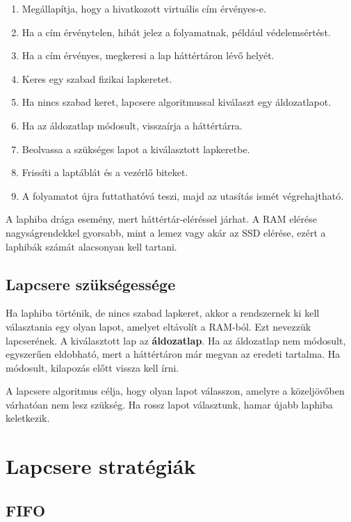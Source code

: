 \begin{enumerate}
  \item Megállapítja, hogy a hivatkozott virtuális cím érvényes-e.
  \item Ha a cím érvénytelen, hibát jelez a folyamatnak, például védelemsértést.
  \item Ha a cím érvényes, megkeresi a lap háttértáron lévő helyét.
  \item Keres egy szabad fizikai lapkeretet.
  \item Ha nincs szabad keret, lapcsere algoritmussal kiválaszt egy áldozatlapot.
  \item Ha az áldozatlap módosult, visszaírja a háttértárra.
  \item Beolvassa a szükséges lapot a kiválasztott lapkeretbe.
  \item Frissíti a laptáblát és a vezérlő biteket.
  \item A folyamatot újra futtathatóvá teszi, majd az utasítás ismét végrehajtható.
\end{enumerate}

A laphiba drága esemény, mert háttértár-eléréssel járhat. A RAM elérése nagyságrendekkel gyorsabb, mint a lemez vagy akár az SSD elérése, ezért a laphibák számát alacsonyan kell tartani.

\subsection{Lapcsere szükségessége}

Ha laphiba történik, de nincs szabad lapkeret, akkor a rendszernek ki kell választania egy olyan lapot, amelyet eltávolít a RAM-ból. Ezt nevezzük lapcserének. A kiválasztott lap az \textbf{áldozatlap}. Ha az áldozatlap nem módosult, egyszerűen eldobható, mert a háttértáron már megvan az eredeti tartalma. Ha módosult, kilapozás előtt vissza kell írni.

A lapcsere algoritmus célja, hogy olyan lapot válasszon, amelyre a közeljövőben várhatóan nem lesz szükség. Ha rossz lapot választunk, hamar újabb laphiba keletkezik.

\section{Lapcsere stratégiák}

\subsection{FIFO}

